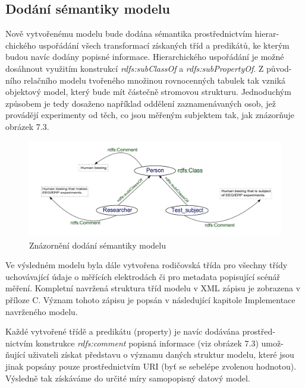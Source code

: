 \documentclass{projekt}
\begin{document}
\subsection{Dodání sémantiky modelu}
\hspace{0.65cm}Nově vytvořenému modelu bude dodána sémantika prostřednictvím hierar-\\chického uspořádání všech transformací získaných tříd a predikátů, ke kterým budou navíc dodány popisné informace. Hierarchického uspořádání je možné dosáhnout využitím konstrukcí {\it rdfs:subClassOf} a {\it rdfs:subPropertyOf}. Z původ-\\ního relačního modelu tvořeného množinou rovnocenných tabulek tak vzniká objektový model, který bude mít částečně stromovou strukturu. Jednoduchým způsobem je tedy dosaženo například oddělení zaznamenávaných osob, jež provádějí experimenty od těch, co jsou měřeným subjektem tak, jak znázorňuje obrázek 7.3.


\begin{figure}[htb]
\begin{center}
\includegraphics[scale=0.52]{semantika.pdf}
\caption{Znázornění dodání sémantiky modelu}
\end{center}
\end{figure}

Ve výsledném modelu byla dále vytvořena rodičovská třída pro všechny třídy uchovávající údaje o měřících elektrodách či pro metadata popisující scénář měření. Kompletní navržená struktura tříd modelu v XML zápisu je zobrazena v příloze C. Význam tohoto zápisu je popsán v následující kapitole Implementace navrženého modelu.

Každé vytvořené třídě a predikátu (property) je navíc dodávána prostřed-\\nictvím konstrukce {\it rdfs:comment} popisná informace (viz obrázek 7.3) umož-\\ňující uživateli získat představu o významu daných struktur modelu, které jsou jinak popsány pouze prostřednictvím URI (byť se sebelépe zvolenou hodnotou). Výsledně tak získáváme do určité míry samopopisný datový model.
\end{document}
